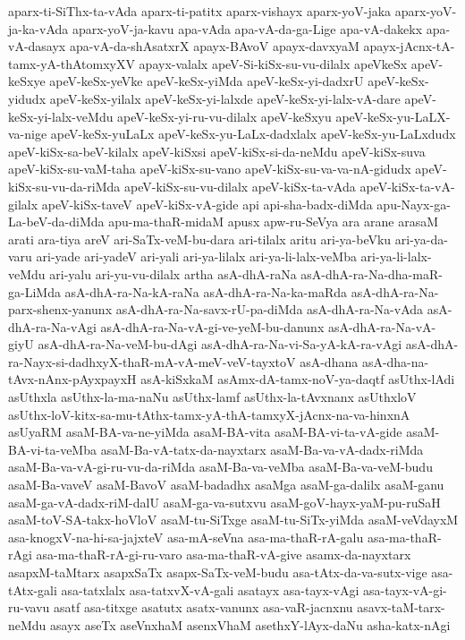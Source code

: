 {aparx-ti-SiThx-ta-vAda
aparx-ti-patitx
aparx-vishayx
aparx-yoV-jaka
aparx-yoV-ja-ka-vAda
aparx-yoV-ja-kavu
apa-vAda
apa-vA-da-ga-Lige
apa-vA-dakekx
apa-vA-dasayx
apa-vA-da-shAsatxrX
apayx-BAvoV
apayx-davxyaM
apayx-jAcnx-tA-tamx-yA-thAtomxyXV
apayx-valalx
apeV-Si-kiSx-su-vu-dilalx
apeVkeSx
apeV-keSxye
apeV-keSx-yeVke
apeV-keSx-yiMda
apeV-keSx-yi-dadxrU
apeV-keSx-yidudx
apeV-keSx-yilalx
apeV-keSx-yi-lalxde
apeV-keSx-yi-lalx-vA-dare
apeV-keSx-yi-lalx-veMdu
apeV-keSx-yi-ru-vu-dilalx
apeV-keSxyu
apeV-keSx-yu-LaLX-va-nige
apeV-keSx-yuLaLx
apeV-keSx-yu-LaLx-dadxlalx
apeV-keSx-yu-LaLxdudx
apeV-kiSx-sa-beV-kilalx
apeV-kiSxsi
apeV-kiSx-si-da-neMdu
apeV-kiSx-suva
apeV-kiSx-su-vaM-taha
apeV-kiSx-su-vano
apeV-kiSx-su-va-va-nA-gidudx
apeV-kiSx-su-vu-da-riMda
apeV-kiSx-su-vu-dilalx
apeV-kiSx-ta-vAda
apeV-kiSx-ta-vA-gilalx
apeV-kiSx-taveV
apeV-kiSx-vA-gide
api
api-sha-badx-diMda
apu-Nayx-ga-La-beV-da-diMda
apu-ma-thaR-midaM
apusx
apw-ru-SeVya
ara
arane
arasaM
arati
ara-tiya
areV
ari-SaTx-veM-bu-dara
ari-tilalx
aritu
ari-ya-beVku
ari-ya-da-varu
ari-yade
ari-yadeV
ari-yali
ari-ya-lilalx
ari-ya-li-lalx-veMba
ari-ya-li-lalx-veMdu
ari-yalu
ari-yu-vu-dilalx
artha
asA-dhA-raNa
asA-dhA-ra-Na-dha-maR-ga-LiMda
asA-dhA-ra-Na-kA-raNa
asA-dhA-ra-Na-ka-maRda
asA-dhA-ra-Na-parx-shenx-yanunx
asA-dhA-ra-Na-savx-rU-pa-diMda
asA-dhA-ra-Na-vAda
asA-dhA-ra-Na-vAgi
asA-dhA-ra-Na-vA-gi-ve-yeM-bu-danunx
asA-dhA-ra-Na-vA-giyU
asA-dhA-ra-Na-veM-bu-dAgi
asA-dhA-ra-Na-vi-Sa-yA-kA-ra-vAgi
asA-dhA-ra-Nayx-si-dadhxyX-thaR-mA-vA-meV-veV-tayxtoV
asA-dhana
asA-dha-na-tAvx-nAnx-pAyxpayxH
asA-kiSxkaM
asAmx-dA-tamx-noV-ya-daqtf
asUthx-lAdi
asUthxla
asUthx-la-ma-naNu
asUthx-lamf
asUthx-la-tAvxnanx
asUthxloV
asUthx-loV-kitx-sa-mu-tAthx-tamx-yA-thA-tamxyX-jAcnx-na-va-hinxnA
asUyaRM
asaM-BA-va-ne-yiMda
asaM-BA-vita
asaM-BA-vi-ta-vA-gide
asaM-BA-vi-ta-veMba
asaM-Ba-vA-tatx-da-nayxtarx
asaM-Ba-va-vA-dadx-riMda
asaM-Ba-va-vA-gi-ru-vu-da-riMda
asaM-Ba-va-veMba
asaM-Ba-va-veM-budu
asaM-Ba-vaveV
asaM-BavoV
asaM-badadhx
asaMga
asaM-ga-dalilx
asaM-ganu
asaM-ga-vA-dadx-riM-dalU
asaM-ga-va-sutxvu
asaM-goV-hayx-yaM-pu-ruSaH
asaM-toV-SA-takx-hoVloV
asaM-tu-SiTxge
asaM-tu-SiTx-yiMda
asaM-veVdayxM
asa-knogxV-na-hi-sa-jajxteV
asa-mA-seVna
asa-ma-thaR-rA-galu
asa-ma-thaR-rAgi
asa-ma-thaR-rA-gi-ru-varo
asa-ma-thaR-vA-give
asamx-da-nayxtarx
asapxM-taMtarx
asapxSaTx
asapx-SaTx-veM-budu
asa-tAtx-da-va-sutx-vige
asa-tAtx-gali
asa-tatxlalx
asa-tatxvX-vA-gali
asatayx
asa-tayx-vAgi
asa-tayx-vA-gi-ru-vavu
asatf
asa-titxge
asatutx
asatx-vanunx
asa-vaR-jacnxnu
asavx-taM-tarx-neMdu
asayx
aseTx
aseVnxhaM
asenxVhaM
asethxY-lAyx-daNu
asha-katx-nAgi
}
